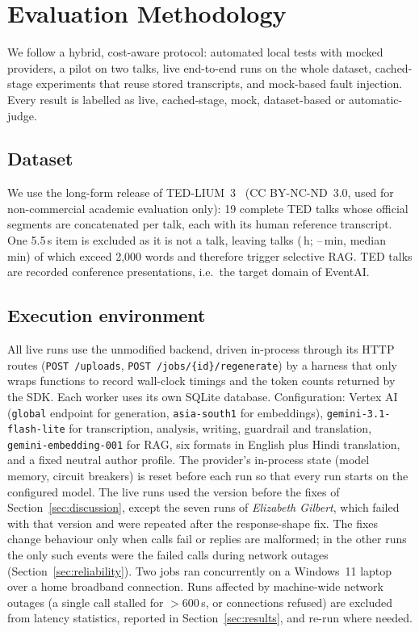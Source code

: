 \section{Evaluation Methodology}\label{sec:method}
We follow a hybrid, cost-aware protocol: automated local tests with mocked providers, a pilot
on two talks, live end-to-end runs on the whole dataset, cached-stage experiments that reuse
stored transcripts, and mock-based fault injection. Every result is labelled as live,
cached-stage, mock, dataset-based or automatic-judge.

\subsection{Dataset}
We use the long-form release of TED-LIUM~3~\cite{hernandez2018tedlium} (CC BY-NC-ND~3.0, used
for non-commercial academic evaluation only): 19 complete TED talks whose official segments
are concatenated per talk, each with its human reference transcript. One 5.5\,s item is
excluded as it is not a talk, leaving \DatasetTalks{} talks (\DatasetHours{}\,h; \DatasetMinMin--\DatasetMaxMin{}\,min,
median \DatasetMedMin{}\,min) of which \DatasetLong{} exceed 2{,}000 words and therefore
trigger selective RAG. TED talks are recorded conference presentations, i.e.\ the target
domain of EventAI.

\subsection{Execution environment}
All live runs use the unmodified backend, driven in-process through its HTTP routes
(\texttt{POST /uploads}, \texttt{POST /jobs/\{id\}/regenerate}) by a harness that only wraps
functions to record wall-clock timings and the token counts returned by the SDK. Each
worker uses its own SQLite database. Configuration: Vertex AI (\texttt{global} endpoint for
generation, \texttt{asia-south1} for embeddings), \texttt{gemini-3.1-flash-lite} for
transcription, analysis, writing, guardrail and translation, \texttt{gemini-embedding-001}
for RAG, six formats in English plus Hindi translation, and a fixed neutral author profile.
The provider's in-process state (model memory, circuit breakers) is reset before each run so
that every run starts on the configured model. The live runs used the version before the fixes
of Section~\ref{sec:discussion}, except the seven runs of \emph{Elizabeth Gilbert}, which
failed with that version and were repeated after the response-shape fix. The fixes change
behaviour only when calls fail or replies are malformed; in the other runs the only such
events were the failed calls during network outages (Section~\ref{sec:reliability}). Two jobs ran concurrently on a Windows~11 laptop over a home broadband
connection. Runs affected by machine-wide network outages (a single call stalled for
$>$600\,s, or connections refused) are excluded from latency statistics, reported in
Section~\ref{sec:results}, and re-run where needed.

